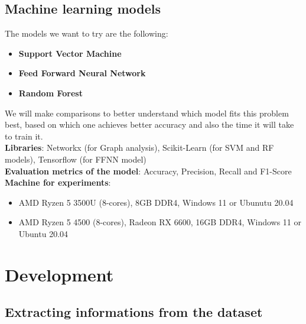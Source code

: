 \documentclass[11pt,a4paper]{article}
\begin{document}
\subsection*{Machine learning models}

The models we want to try are the following:
\begin{itemize}
	\setlength\itemsep{-0.3em}
	\item \textbf{Support Vector Machine}
	\item \textbf{Feed Forward Neural Network}
	\item \textbf{Random Forest}
\end{itemize}

We will make comparisons to better understand which model fits this problem best, based on which one achieves better accuracy and also the time it will take to train it.
\\\textbf{Libraries}: Networkx\cite{networkx} (for Graph analysis), Scikit-Learn\cite{scikit} (for SVM and RF models), Tensorflow\cite{tensor} (for FFNN model)
\\\textbf{Evaluation metrics of the model}: Accuracy, Precision, Recall and F1-Score
\\\textbf{Machine for experiments}: 
\begin{itemize}
	\setlength\itemsep{-0.3em}
	\item AMD Ryzen 5 3500U (8-cores), 8GB DDR4, Windows 11 or Ubunutu 20.04
	\item AMD Ryzen 5 4500 (8-cores), Radeon RX 6600, 16GB DDR4, Windows 11 or Ubuntu 20.04
\end{itemize}

\newpage

\section*{Development}

\subsection*{Extracting informations from the dataset}
\end{document}
